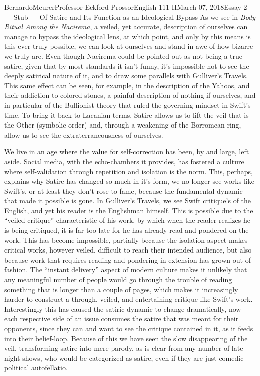 \documentclass[12pt,letterpaper]{article}
\begin{document}
\begin{mla}{Bernardo}{Meurer}{Professor Eckford-Prossor}{English 111 H}{March 07, 2018}{Essay 2 --- Stub --- Of Satire and Its Function as an Ideological Bypass}
    As we see in \textit{Body Ritual Among the Nacirema}, a veiled, yet accurate, description of ourselves can manage to bypass the ideological lens, at which point, and only by this means is this ever truly possible, we can look at ourselves and stand in awe of how bizarre we truly are. Even though Nacirema could be pointed out as not being a true satire, given that by most standards it isn't funny, it's impossible not to see the deeply satirical nature of it, and to draw some parallels with Gulliver's Travels. This same effect can be seen, for example, in the description of the Yahoos, and their addiction to colored stones, a painful description of nothing if ourselves, and in particular of the Bullionist theory that ruled the governing mindset in Swift's time. To bring it back to Lacanian terms, Satire allows us to lift the veil that is the Other (symbolic order) and, through a weakening of the Borromean ring, allow us to see the extraterraneousness of ourselves.

    We live in an age where the value for self-correction has been, by and large, left aside. Social media, with the echo-chambers it provides, has fostered a culture where self-validation through repetition and isolation is the norm. This, perhaps, explains why Satire has changed so much in it's form, we no longer see works like Swift's, or at least they don't rose to fame, because the fundamental dynamic that made it possible is gone. In Gulliver's Travels, we see Swift critique's of the English, and yet his reader is the Englishman himself. This is possible due to the ``veiled critique'' characteristic of his work, by which when the reader realizes he is being critiqued, it is far too late for he has already read and pondered on the work. This has become impossible, partially because the isolation aspect makes critical works, however veiled, difficult to reach their intended audience, but also because work that requires reading and pondering in extension has grown out of fashion. The ``instant delivery'' aspect of modern culture makes it unlikely that any meaningful number of people would go through the trouble of reading something that is longer than a couple of pages, which makes it increasingly harder to construct a through, veiled, and entertaining critique like Swift's work. Interestingly this has caused the satiric dynamic to change dramatically, now each respective side of an issue consumes the satire that was meant for their opponents, since they can and want to see the critique contained in it, as it feeds into their belief-loop. Because of this we have seen the slow disappearing of the veil, transforming satire into mere parody, as is clear from any number of late night shows, who would be categorized as satire, even if they are just comedic-political autofellatio.


\end{mla}
\end{document}
